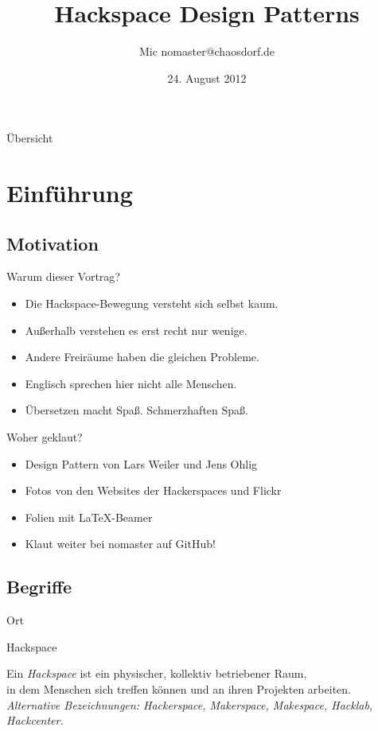 \documentclass[aspectratio=1610]{beamer}
\title{Hackspace Design Patterns}
\author[Mic]{Mic \flq nomaster@chaosdorf.de\frq}
\institute[chaosdorf]{Chaos Computer Club Düsseldorf / Chaosdorf e.V.}
\date[]{24. August 2012}
\newcommand{\concept}[2]{
  \begin{block}{#1}
    \pause
    #2
  \end{block}
}
\begin{document}
  \begin{frame}
    \titlepage
  \end{frame}

  \begin{frame}{Übersicht}
    \tableofcontents
  \end{frame}

  \section{Einführung}

  \subsection{Motivation}

  \begin{frame}{Warum dieser Vortrag?}
    \begin{itemize}
      \item Die Hackspace-Bewegung versteht sich selbst kaum.
      \pause
      \item Außerhalb verstehen es erst recht nur wenige.
      \pause
      \item Andere Freiräume haben die gleichen Probleme.
      \pause
      \item Englisch sprechen hier nicht alle Menschen.
      \pause
      \item Übersetzen macht Spaß. Schmerzhaften Spaß.
    \end{itemize}
  \end{frame}

  \begin{frame}{Woher geklaut?}
    \begin{itemize}
      \item Design Pattern von Lars Weiler und Jens Ohlig
      \item Fotos von den Websites der Hackerspaces und Flickr
      \item Folien mit \LaTeX-Beamer
      \item Klaut weiter bei nomaster auf GitHub!
    \end{itemize}
  \end{frame}

  \subsection{Begriffe}

  \begin{frame}{Ort}
    \concept{Hackspace}{
      Ein \textsl{Hackspace} ist ein physischer, kollektiv betriebener Raum,\\
      in dem Menschen sich treffen können und an ihren Projekten arbeiten.\\
      \pause
      \textsl{Alternative Bezeichnungen: Hackerspace, Makerspace, Makespace,
      Hacklab, Hackcenter.}
    }
  \end{frame}
\end{document}
